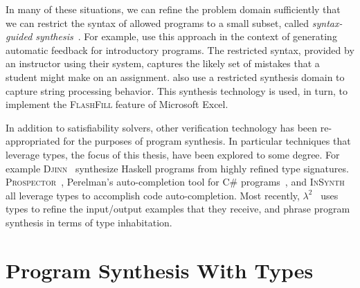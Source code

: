 In many of these situations, we can refine the problem domain sufficiently that we can restrict the syntax of allowed programs to a small subset, called \emph{syntax-guided synthesis}~\citep{alur-fmcad-2013}.
For example, \citet{singh-pldi-2013} use this approach in the context of generating automatic feedback for introductory programs.
The restricted syntax, provided by an instructor using their system, captures the likely set of mistakes that a student might make on an assignment.
\citet{gulwani-popl-2011} also use a restricted synthesis domain to capture string processing behavior.
This synthesis technology is used, in turn, to implement the \textsc{FlashFill} feature of Microsoft Excel.

In addition to satisfiability solvers, other verification technology has been re-appropriated for the purposes of program synthesis.
In particular techniques that leverage types, the focus of this thesis, have been explored to some degree.
For example \textsc{Djinn}~\citep{augustsson-2004} synthesize Haskell programs from highly refined type signatures.
\textsc{Prospector}~\citep{mandelin-pldi-2005}, Perelman's auto-completion tool for C\# programs~\citep{perelman-pldi-2012}, and \textsc{InSynth}~\citep{gvero-pldi-2013} all leverage types to accomplish code auto-completion.
Most recently, $λ^2$~\citep{feser-pldi-2015} uses types to refine the input/output examples that they receive, and \citet{scherer-icfp-2015} phrase program synthesis in terms of type inhabitation.

\section{Program Synthesis With Types}

